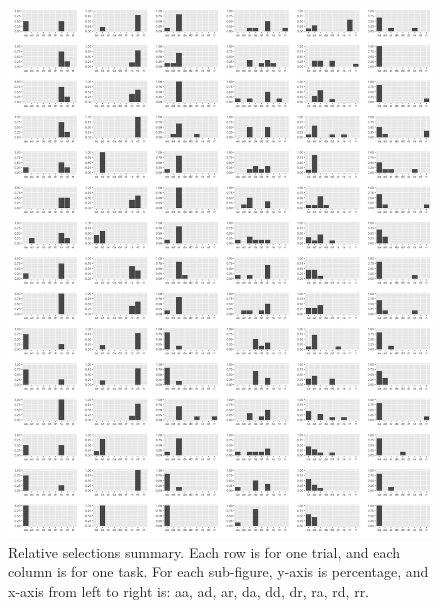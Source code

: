 \documentclass{article}
\begin{document}
\newpage
\begin{figure}
  \centering
  \includegraphics[width=.85\linewidth]{trials_relative}
  \caption{Relative selections summary. Each row is for one trial, and each column is for one task. For each sub-figure, y-axis is percentage, and x-axis from left to right is: aa, ad, ar, da, dd, dr, ra, rd, rr.}
\end{figure}
\end{document}
